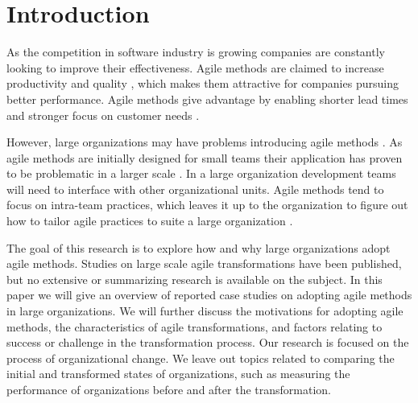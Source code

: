 \documentclass[lnbip]{svmultln}
\begin{document}
\section{Introduction}

As the competition in software industry is growing companies are constantly
looking to improve their effectiveness. Agile methods are claimed to increase
productivity and quality , which makes them attractive
for companies pursuing better performance. Agile methods give advantage by
enabling shorter lead times and stronger focus on customer needs
.

However, large organizations may have problems introducing agile methods
. As agile methods are initially designed for small teams
their application has proven to be problematic in a larger scale
. In a large organization development teams will need to
interface with other organizational units. Agile methods tend to focus on
intra-team practices, which leaves it up to the organization to figure out how to
tailor agile practices to suite a large organization .

% 

The goal of this research is to explore how and why large organizations adopt
agile methods. Studies on large scale agile transformations have been published,
but no extensive or summarizing research is available on the subject. In this
paper we will give an overview of reported case studies on adopting agile
methods in large organizations. We will further discuss the motivations for
adopting agile methods, the characteristics of agile transformations, and
factors relating to success or challenge in the transformation process. Our
research is focused on the process of organizational change. We leave out topics
related to comparing the initial and transformed states of organizations, such
as measuring the performance of organizations before and after the
transformation.
\end{document}
